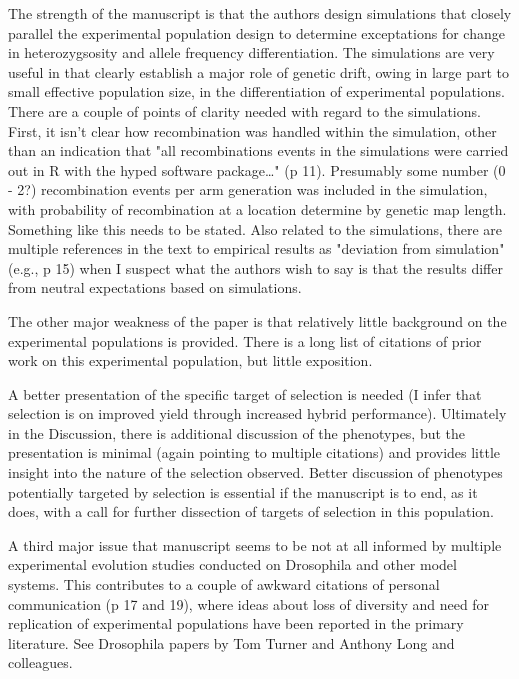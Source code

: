 \documentclass[onecolumn,oneside,letterpaper]{article}
\begin{document}
The strength of the manuscript is that the authors design simulations that closely parallel the experimental 
population design to determine exceptations for change in heterozygsosity and allele frequency 
differentiation. The simulations are very useful in that clearly establish a major role of genetic drift, owing 
in large part to small effective population size, in the differentiation of experimental populations. There are 
a couple of points of clarity needed with regard to the simulations. First, it isn't clear how recombination 
was handled within the simulation, other than an indication that "all recombinations events in the 
simulations were carried out in R with the hyped software package…" (p 11). Presumably some number (0 - 
2?) recombination events per arm generation was included in the simulation, with probability of 
recombination at a location determine by genetic map length. Something like this needs to be stated. Also 
related to the simulations, there are multiple references in the text to empirical results as "deviation from 
simulation" (e.g., p 15) when I suspect what the authors wish to say is that the results differ from neutral 
expectations based on simulations.


The other major weakness of the paper is that relatively little background on the experimental populations 
is provided. There is a long list of citations of prior work on this experimental population, but little 
exposition.


 A better presentation of the specific target of selection is needed (I infer that selection is on 
improved yield through increased hybrid performance). Ultimately in the Discussion, there is additional 
discussion of the phenotypes, but the presentation is minimal (again pointing to multiple citations) and 
provides little insight into the nature of the selection observed. Better discussion of phenotypes potentially 
targeted by selection is essential if the manuscript is to end, as it does, with a call for further dissection of 
targets of selection in this population.


A third major issue that manuscript seems to be not at all informed by multiple experimental evolution 
studies conducted on Drosophila and other model systems. This contributes to a couple of awkward 
citations of personal communication (p 17 and 19), where ideas about loss of diversity and need for 
replication of experimental populations have been reported in the primary literature. See Drosophila papers 
by Tom Turner and Anthony Long and colleagues.
\end{document}
